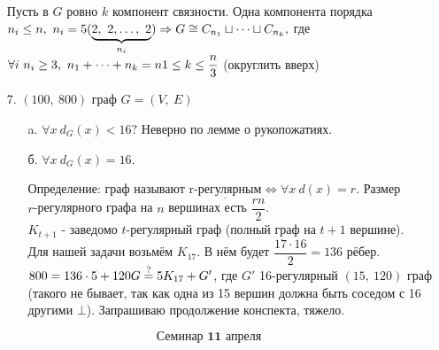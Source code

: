 \documentclass[12pt, letterpaper, twoside]{article}
\begin{document}
\begin{enumerate}
\\
            Пусть в $G $ ровно $ k$ компонент связности. Одна компонента порядка $n_i \leq n,\ n_i = 5\\
            (\underset{n_i}{\underbrace{2,\ 2,\dots,\ 2}})\Rightarrow G \cong C_{n_1}\sqcup\dots \sqcup C_{n_k},$ где $\forall i\ n_i\geq 3,\ n_1 + \dots + n_k = n\\
            1 \leq k \leq \dfrac{n}{3}$ (округлить вверх)
            \item[7.] $(100,\ 800)$ граф $G = (V,\ E)$
            \begin{enumerate}
                \item[a.] $\forall x\ d_G(x) < 16?$ Неверно по лемме о рукопожатиях.
                \item[б.] $\forall x\ d_G(x) = 16$.
                \item[Определение:] граф называют $\underline{\text{r-регулярным}}\Leftrightarrow \forall x\ d(x) = r$. Размер\\
                $r$-регулярного графа на $n$ вершинах есть $\dfrac{rn}{2}$.\\
                $K_{t + 1}$ - заведомо $t$-регулярный граф (полный граф на $t + 1$ вершине).\\
                Для нашей задачи возьмём $K_{17}$. В нём будет $\dfrac{17\cdot 16}{2} = 136$ рёбер.\\
                $800 = 136\cdot 5 + 120\\
                G \overset{?}{=} 5K_{17} + G'$, где $G'$ 16-регулярный $(15,\ 120)$ граф (такого не бывает, так как одна из 15 вершин должна быть соседом с 16 другими $\bot$). Запрашиваю продолжение конспекта, тяжело.
            \end{enumerate}

        \end{enumerate}
        \[\textbf{Семинар 11 апреля}\]
\end{document}
